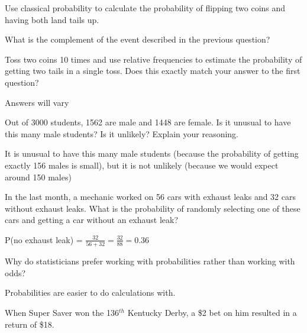\documentclass[addpoints]{exam}
\begin{document}
\bracketedpoints
\pointsinmargin
\begin{questions}

\question Use classical probability to calculate the probability of flipping two coins and having both land tails up.

\question What is the complement of the event described in the previous question?


\question Toss two coins 10 times and use relative frequencies to estimate the probability of getting two tails in a single toss. Does this exactly match your answer to the first question?
\begin{solution}[\stretch{1}]
Answers will vary
\end{solution}


\question Out of 3000 students, 1562 are male and 1448 are female. Is it unusual to have this many male students? Is it unlikely? Explain your reasoning.
\begin{solution}[\stretch{1}]
It is unusual to have this many male students (because the probability of getting exactly 156 males is small), but it is not unlikely (because we would expect around 150 males)
\end{solution}

\question In the last month, a mechanic worked on 56 cars with exhaust leaks and 32 cars without exhaust leaks. What is the probability of randomly selecting one of these cars and getting a car without an exhaust leak?
\begin{solution}[\stretch{1}]
P(no exhaust leak) = $\frac{32}{56+32}=\frac{32}{88}=0.36$
\end{solution}

\question Why do statisticians prefer working with probabilities rather than working with odds?
\begin{solution}[\stretch{1}]
Probabilities are easier to do calculations with.
\end{solution}

\newpage

\question When Super Saver won the 136$^{th}$ Kentucky Derby, a \$2 bet on him resulted in a return of \$18.
\end{questions}
\end{document}
